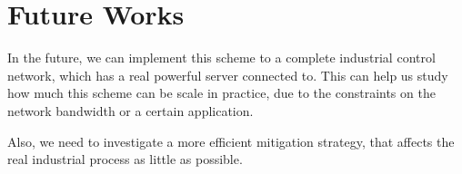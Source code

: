 
\section{Future Works}

In the future, we can implement this scheme to a complete industrial control network, which has a real powerful server connected to. This can help us study how much this scheme can be scale in practice, due to the constraints on the network bandwidth or a certain application. 

Also, we need to investigate a more efficient mitigation strategy, that affects the real industrial process as little as possible.  
